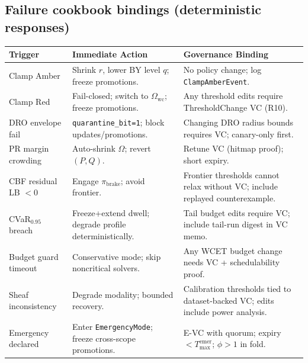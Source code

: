 \documentclass[10pt]{article}
\begin{document}
\subsection*{Failure cookbook bindings (deterministic responses)}
\begin{center}
\renewcommand{\arraystretch}{1.15}
\begin{tabularx}{\textwidth}{@{} l l X @{}}
\toprule
\textbf{Trigger} & \textbf{Immediate Action} & \textbf{Governance Binding} \\
\midrule
Clamp \textsf{Amber} & Shrink $r$, lower BY level $q$; freeze promotions. & No policy change; log \texttt{ClampAmberEvent}. \\
Clamp \textsf{Red} & Fail-closed; switch to $\Omega_{\mathrm{wc}}$; freeze promotions. & Any threshold edits require ThresholdChange VC (R10). \\
DRO envelope fail & \texttt{quarantine\_bit=1}; block updates/promotions. & Changing DRO radius bounds requires VC; canary-only first. \\
PR margin crowding & Auto-shrink $\Omega$; revert $(P,Q)$. & Retune VC (hitmap proof); short expiry. \\
CBF residual LB $<0$ & Engage $\pi_{\mathrm{brake}}$; avoid frontier. & Frontier thresholds cannot relax without VC; include replayed counterexample. \\
CVaR$_{0.95}$ breach & Freeze+extend dwell; degrade profile deterministically. & Tail budget edits require VC; include tail-run digest in VC memo. \\
Budget guard timeout & Conservative mode; skip noncritical solvers. & Any WCET budget change needs VC + schedulability proof. \\
Sheaf inconsistency & Degrade modality; bounded recovery. & Calibration thresholds tied to dataset-backed VC; edits include power analysis. \\
Emergency declared & Enter \texttt{EmergencyMode}; freeze cross-scope promotions. & E-VC with quorum; expiry $<T_{\mathrm{max}}^{\mathrm{emer}}$; $\phi>1$ in fold. \\
\bottomrule
\end{tabularx}
\end{center}

\end{document}
